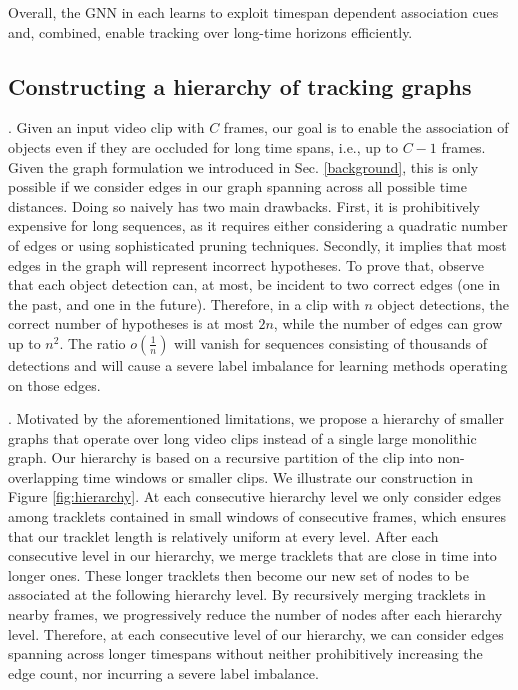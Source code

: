 \documentclass[10pt,twocolumn,letterpaper]{article}
\begin{document}
{{Overall, the GNN in each \blockname learns to exploit timespan dependent association cues and, combined, \blocknameplural enable tracking over long-time horizons efficiently.

\subsection{Constructing a hierarchy of tracking graphs} \label{section:graph_hierarchy}









. 
Given an input video clip with $C$ frames, our goal is to enable the association of objects even if they are occluded for long time spans, i.e., up to $C-1$ frames.
Given the graph formulation we introduced in Sec. \ref{background}, this is only possible if we consider edges in our graph spanning across all possible time distances. Doing so naively has two main drawbacks. First, it is prohibitively expensive for long sequences, as it requires either considering a quadratic number of edges or using sophisticated pruning techniques. 
Secondly, it  implies that most edges in the graph will represent incorrect hypotheses. To prove that, observe that each object detection can, at most, be incident to two correct edges (one in the past, and one in the future). Therefore, in a clip with $n$ object detections, the correct number of hypotheses is at most $2n$, while the number of edges can grow up to  $n^2$. The ratio  $o\left ( \frac{1}{n}\right)$ will vanish for sequences consisting of thousands of detections and will cause a severe label imbalance for learning methods operating on those edges.




. Motivated by the aforementioned limitations, we  propose a hierarchy of smaller graphs that operate over long video clips instead of a single large monolithic graph. 
Our hierarchy is based on a recursive partition of the clip into non-overlapping time windows or smaller clips. We illustrate our construction in Figure \ref{fig:hierarchy}. At each consecutive hierarchy level we only consider edges among tracklets contained in small windows of consecutive frames, which ensures that our tracklet length is relatively uniform at every level. After each consecutive level in our hierarchy, we merge tracklets that are close in time into longer ones. These longer tracklets then become our new set of nodes to be associated at the following hierarchy level. By recursively merging tracklets in nearby frames, we progressively reduce the number of nodes after each hierarchy level. 
Therefore, at each consecutive level of our hierarchy, we can consider edges spanning across longer timespans without neither prohibitively increasing the edge count, nor incurring a severe label imbalance. 










}}
\end{document}
